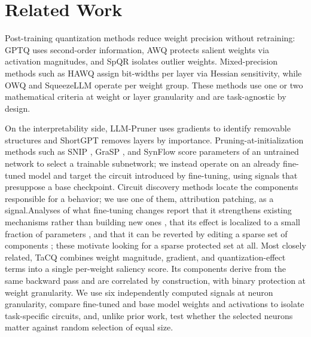 \documentclass[11pt]{article}
\begin{document}
\section{Related Work}
Post-training quantization methods reduce weight precision 
without retraining: GPTQ 
\cite{frantar2023gptqaccurateposttrainingquantization} uses 
second-order information, AWQ 
\cite{lin2024awqactivationawareweightquantization} protects 
salient weights via activation magnitudes, and SpQR 
\cite{dettmers2023spqrsparsequantizedrepresentationnearlossless} 
isolates outlier weights. Mixed-precision methods such as HAWQ 
\cite{dong2019hawqhessianawarequantization} assign bit-widths 
per layer via Hessian sensitivity, while OWQ 
\cite{lee2024owqoutlierawareweightquantization} and SqueezeLLM 
\cite{kim2024squeezellmdenseandsparsequantization} operate per 
weight group. These methods use one or two mathematical criteria 
at weight or layer granularity and are task-agnostic by design.

On the interpretability side, LLM-Pruner 
\cite{ma2023llmprunerstructuralpruninglarge} uses gradients to 
identify removable structures and ShortGPT 
\cite{men2024shortgptlayerslargelanguage} removes layers by 
importance. Pruning-at-initialization methods such as SNIP 
\cite{lee2019snipsingleshotnetworkpruning}, GraSP 
\cite{wang2020pickingwinningticketstraining}, and SynFlow 
\cite{tanaka2020pruningneuralnetworksdata} score parameters of 
an untrained network to select a trainable subnetwork; we 
instead operate on an already fine-tuned model and target the 
circuit introduced by fine-tuning, using signals that presuppose 
a base checkpoint. Circuit discovery methods 
\cite{conmy2023automatedcircuitdiscoverymechanistic,
syed2023attributionpatchingoutperformsautomated} locate the 
components responsible for a behavior; we use one of them, 
attribution patching, as a signal.Analyses of what fine-tuning changes report that it strengthens existing mechanisms rather than building new ones \cite{prakash2024finetuningenhancesexistingmechanisms}, that 
its effect is localized to a small fraction of parameters 
\cite{panigrahi2023taskspecificskilllocalizationfinetuned}, 
and that it can be reverted by editing a sparse set of 
components \cite{jain2024mechanisticallyanalyzingeffectsfinetuning}; 
these motivate looking for a sparse protected set at all. Most closely related, TaCQ \cite{xiao2025taskcircuitquantizationleveragingknowledge} 
combines weight magnitude, gradient, and quantization-effect 
terms into a single per-weight saliency score. Its components 
derive from the same backward pass and are correlated by 
construction, with binary protection at weight granularity. We 
use six independently computed signals at neuron granularity, 
compare fine-tuned and base model weights and activations to 
isolate task-specific circuits, and, unlike prior work, test 
whether the selected neurons matter against random selection of 
equal size.
\end{document}
